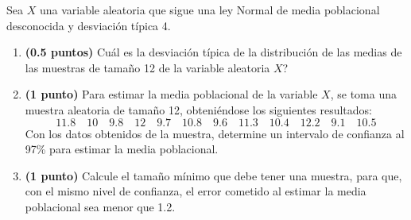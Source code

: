 
Sea $X$ una variable aleatoria que sigue una ley Normal de media poblacional
desconocida y desviación típica 4.
\begin{enumerate}[label=\alph*)]
  \item \textbf{(0.5 puntos)} \textquestiondown{}Cuál es la desviación típica
  de la distribución de las medias de las muestras de tamaño 12 de la variable
  aleatoria $X$?
  \item \textbf{(1 punto)} Para estimar la media poblacional de la variable
  $X$, se toma una muestra aleatoria de tamaño 12, obteniéndose los siguientes
  resultados:
  \[
  11.8\quad 10\quad 9.8\quad 12\quad 9.7\quad 10.8\quad
  9.6\quad 11.3\quad 10.4\quad 12.2\quad 9.1\quad 10.5
  \]
  Con los datos obtenidos de la muestra, determine un intervalo de confianza
  al 97\% para estimar la media poblacional.
  \item \textbf{(1 punto)} Calcule el tamaño mínimo que debe tener una muestra,
  para que, con el mismo nivel de confianza, el error cometido al estimar la
  media poblacional sea menor que 1.2.
\end{enumerate}
